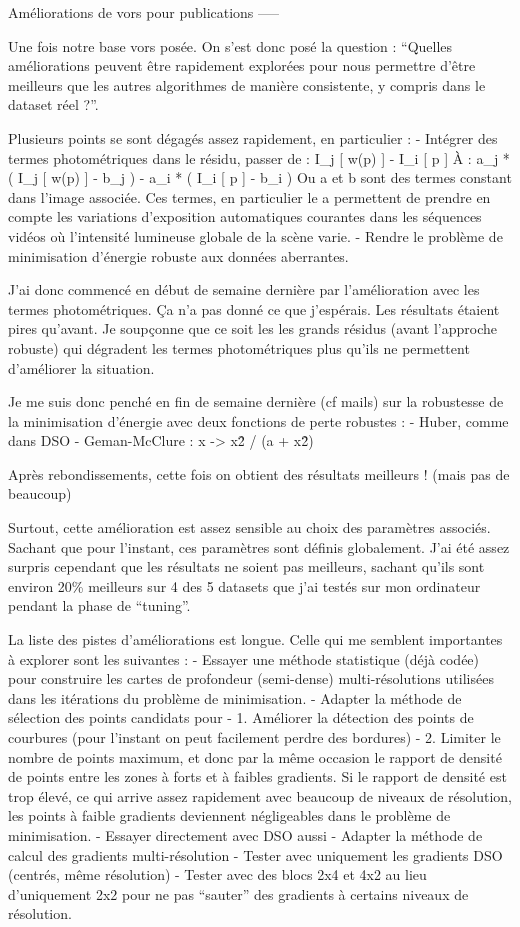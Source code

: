 Améliorations de vors pour publications
-----

Une fois notre base vors posée. On s’est donc posé la question : “Quelles améliorations peuvent être rapidement explorées pour nous permettre d’être meilleurs que les autres algorithmes de manière consistente, y compris dans le dataset réel ?”.

Plusieurs points se sont dégagés assez rapidement, en particulier :
- Intégrer des termes photométriques dans le résidu, passer de : I\_j [ w(p) ] - I\_i [ p ]
À : a\_j * ( I\_j [ w(p) ] - b\_j )  -  a\_i * ( I\_i [ p ] - b\_i )
Ou a et b sont des termes constant dans l’image associée. Ces termes, en particulier le a permettent de prendre en compte les variations d’exposition automatiques courantes dans les séquences vidéos où l’intensité lumineuse globale de la scène varie.
- Rendre le problème de minimisation d’énergie robuste aux données aberrantes.

J’ai donc commencé en début de semaine dernière par l’amélioration avec les termes photométriques. Ça n’a pas donné ce que j’espérais. Les résultats étaient pires qu’avant. Je soupçonne que ce soit les les grands résidus (avant l’approche robuste) qui dégradent les termes photométriques plus qu’ils ne permettent d’améliorer la situation.

Je me suis donc penché en fin de semaine dernière (cf mails) sur la robustesse de la minimisation d’énergie avec deux fonctions de perte robustes :
- Huber, comme dans DSO
- Geman-McClure : x -> x\^2 / (a + x\^2)

Après rebondissements, cette fois on obtient des résultats meilleurs ! (mais pas de beaucoup)

Surtout, cette amélioration est assez sensible au choix des paramètres associés. Sachant que pour l’instant, ces paramètres sont définis globalement. J’ai été assez surpris cependant que les résultats ne soient pas meilleurs, sachant qu’ils sont environ 20\% meilleurs sur 4 des 5 datasets que j’ai testés sur mon ordinateur pendant la phase de “tuning”.

La liste des pistes d’améliorations est longue. Celle qui me semblent importantes à explorer sont les suivantes :
- Essayer une méthode statistique (déjà codée) pour construire les cartes de profondeur (semi-dense) multi-résolutions utilisées dans les itérations du problème de minimisation.
- Adapter la méthode de sélection des points candidats pour
  - 1. Améliorer la détection des points de courbures (pour l’instant on peut facilement perdre des bordures)
  - 2. Limiter le nombre de points maximum, et donc par la même occasion le rapport de densité de points entre les zones à forts et à faibles gradients. Si le rapport de densité est trop élevé, ce qui arrive assez rapidement avec beaucoup de niveaux de résolution, les points à faible gradients deviennent négligeables dans le problème de minimisation.
  - Essayer directement avec DSO aussi
- Adapter la méthode de calcul des gradients multi-résolution
  - Tester avec uniquement les gradients DSO (centrés, même résolution)
  - Tester avec des blocs 2x4 et 4x2 au lieu d’uniquement 2x2 pour ne pas “sauter” des gradients à certains niveaux de résolution.

